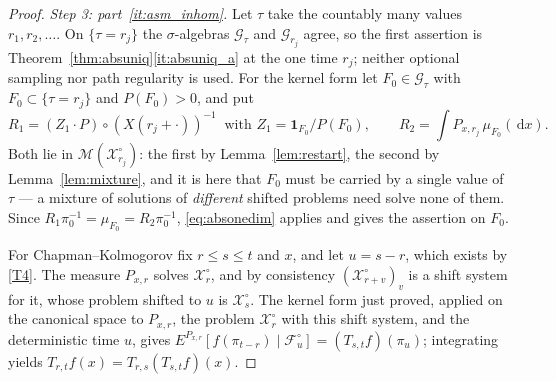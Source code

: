 \documentclass[11pt,a4paper]{article}
\theoremstyle{plain}
\theoremstyle{definition}
\theoremstyle{remark}
\newcommand{\Filt}{\mathcal{F}}
\newcommand{\Gilt}{\mathcal{G}}
\newcommand{\XX}{\mathcal{X}}                  %
\newcommand{\Msol}{\mathcal{M}}
\newcommand{\one}{\mathbf{1}}
\newcommand{\dif}{\,\mathrm{d}}
\begin{document}
\begin{proof}
  \emph{Step 3: part~\ref{it:asm_inhom}.}  Let $\tau$ take the countably many
  values $r_1, r_2, \dots$.  On $\{\tau = r_j\}$ the $\sigma$-algebras $\Gilt_\tau$
  and $\Gilt_{r_j}$ agree, so the first assertion is
  Theorem~\ref{thm:absuniq}\ref{it:absuniq_a} at the one time $r_j$; neither
  optional sampling nor path regularity is used.  For the kernel form let
  $F_0 \in \Gilt_\tau$ with $F_0 \subset \{\tau = r_j\}$ and $P(F_0) > 0$, and
  put
  \[
    R_1 = (Z_1 \cdot P) \circ (X(r_j+\cdot))^{-1}
      \ \text{ with } Z_1 = \one_{F_0}/P(F_0) ,
    \qquad
    R_2 = \int P_{x,r_j} \, \mu_{F_0}(\dif x) .
  \]
  Both lie in $\Msol(\XX^\circ_{r_j})$: the first by Lemma~\ref{lem:restart}, the
  second by Lemma~\ref{lem:mixture}, and it is here that $F_0$ must be carried by
  a single value of $\tau$ --- a mixture of solutions of \emph{different} shifted
  problems need solve none of them.  Since $R_1\pi_0^{-1} = \mu_{F_0} =
  R_2\pi_0^{-1}$, \eqref{eq:absonedim} applies and gives the assertion on $F_0$.

  For Chapman--Kolmogorov fix $r \leq s \leq t$ and $x$, and let $u = s - r$,
  which exists by \eqref{T4}.  The measure $P_{x,r}$ solves $\XX^\circ_r$, and by
  consistency $(\XX^\circ_{r+v})_v$ is a shift system for it, whose problem shifted
  to $u$ is $\XX^\circ_s$.  The kernel form just proved, applied on the canonical
  space to $P_{x,r}$, the problem $\XX^\circ_r$ with this shift system, and the
  deterministic time $u$, gives
  $E^{P_{x,r}}[f(\pi_{t-r}) \mid \Filt^\circ_u] = (T_{s,t}f)(\pi_u)$;
  integrating yields $T_{r,t} f(x) = T_{r,s}(T_{s,t}f)(x)$.
\end{proof}
\end{document}
